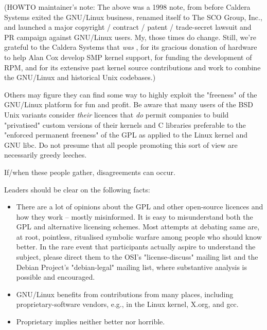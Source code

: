 (HOWTO maintainer's note:  The above was a 1998 note, from before
Caldera Systems exited the GNU/Linux business, renamed itself to The SCO Group,
Inc., and launched a major copyright / contract / patent / trade-secret
lawsuit and PR campaign against GNU/Linux users.  My, those times do change.
Still, we're grateful to the Caldera Systems that {\itshape  was \/}, for
its gracious donation of hardware to help Alan Cox develop SMP kernel
support, for funding the development of RPM, and for its extensive past
kernel source contributions and work to combine the GNU/Linux and historical
Unix codebases.)



 
Others may figure they can find some way to highly exploit the
"freeness" of the GNU/Linux platform for fun and profit. Be aware that many
users of the BSD Unix variants consider {\itshape their\/} licences that
{\itshape do\/} permit companies to build "privatised" custom versions of
their kernels and C libraries preferable to the "enforced permanent
freeness" of the GPL as applied to the Linux kernel and GNU libc.  Do
not presume that all people promoting this sort of view are necessarily
greedy leeches.



 
If/when these people gather, disagreements can occur.



 
Leaders should be clear on the following facts:

\begin{itemize}
\item There are a lot of opinions about the GPL and other open-source
licences and how they work -- mostly misinformed.  It is easy to
misunderstand both the GPL and alternative licensing schemes.  Most
attempts at debating same are, at root,  pointless, ritualised symbolic
warfare among people who should know better.  In the rare event that
participants actually aspire to understand the subject, please direct
them to the OSI's "license-discuss" mailing list and the Debian
Project's "debian-legal" mailing list, where substantive analysis is
possible and encouraged.
\item  GNU/Linux benefits from contributions from many places, including
proprietary-software vendors, e.g., in the Linux kernel, X.org, and
gcc.
\item  Proprietary implies neither better nor horrible.
\end{itemize}




